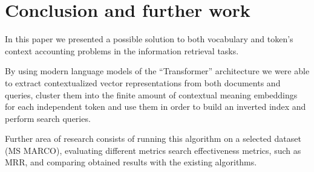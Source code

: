 \documentclass[
    twocolumn,
]{template/ceurart}
\begin{document}
    \section{Conclusion and further work}

    In this paper we presented a possible solution to both vocabulary and token's context accounting problems in
    the information retrieval tasks.

    By using modern language models of the ``Transformer'' architecture we were able to extract contextualized vector
    representations from both documents and queries, cluster them into the finite amount of contextual meaning
    embeddings for each independent token
    and use them in order to build an inverted index and perform search queries.

    Further area of research consists of running this algorithm on a selected dataset (MS MARCO),
    evaluating different metrics search effectiveness metrics, such as MRR, and comparing obtained results with the
    existing algorithms.


    
\end{document}
